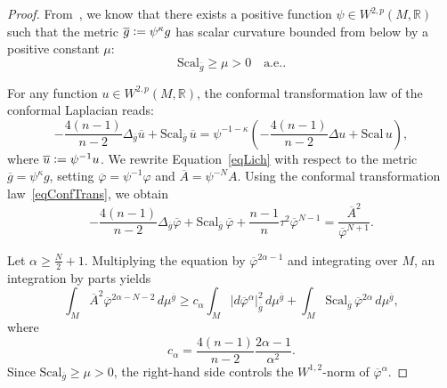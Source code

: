 \documentclass[a4paper, 10pt, reqno]{amsart}
\theoremstyle{plain}
\theoremstyle{remark}
\theoremstyle{definition}
\renewcommand{\phi}{\varphi}
\newcommand{\bR}{\mathbb{R}}
\newcommand{\gbar}{\overline{g}}
\newcommand{\Abar}{\overline{A}}
\newcommand{\phibar}{\overline{\varphi}}
\newcommand{\ubar}{\overline{u}}
\newcommand{\definedas}{\mathrel{\raise.095ex\hbox{\rm :}\mkern-5.2mu=}}
\newcommand{\scal}{\mathrm{Scal}}
\begin{document}
\begin{proof}
    From~\cite{LeeParker}, we know that there exists a positive function $\psi \in
        W^{2, p}(M, \bR)$ such that the metric $\gbar \definedas \psi^\kappa g$ has
    scalar curvature bounded from below by a positive constant $\mu$:
    \[
        \scal_{\gbar} \geq \mu > 0 \quad \text{a.e.}.
    \]

    For any function $u \in W^{2, p}(M, \bR)$, the conformal transformation law of
    the conformal Laplacian reads:
    \begin{equation}\label{eqConfTrans}
        - \frac{4(n-1)}{n-2} \Delta_{\gbar} \ubar + \scal_{\gbar}\,\ubar = \psi^{-1-\kappa} \left(- \frac{4(n-1)}{n-2} \Delta u + \scal\,u\right),
    \end{equation}
    where $\ubar \definedas \psi^{-1} u$. We rewrite Equation~\eqref{eqLich} with
    respect to the metric $\gbar = \psi^\kappa g$, setting $\phibar =
        \psi^{-1}\phi$ and $\Abar = \psi^{-N} A$. Using the conformal transformation
    law~\eqref{eqConfTrans}, we obtain
    \[
        -\frac{4(n-1)}{n-2}\Delta_{\gbar}\phibar
        + \scal_{\gbar}\,\phibar
        + \frac{n-1}{n}\tau^2 \phibar^{N-1}
        = \frac{\Abar^2}{\phibar^{N+1}}.
    \]

    Let $\alpha \geq \frac{N}{2} + 1$. Multiplying the equation by
    $\phibar^{2\alpha-1}$ and integrating over $M$, an integration by parts yields
    \[
        \int_M \Abar^2 \phibar^{2\alpha-N-2}\, d\mu^{\gbar}
        \ge
        c_\alpha \int_M |d\phibar^\alpha|_{\gbar}^2\, d\mu^{\gbar}
        + \int_M \scal_{\gbar}\, \phibar^{2\alpha}\, d\mu^{\gbar},
    \]
    where
    \[
        c_\alpha
        = \frac{4(n-1)}{n-2}\frac{2\alpha-1}{\alpha^2}.
    \]
    Since $\scal_{\gbar} \ge \mu > 0$, the right-hand side controls the $W^{1,
                2}$-norm of $\phibar^\alpha$.


\end{proof}
\end{document}
